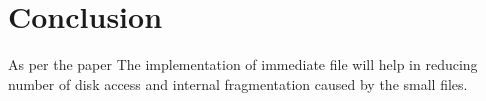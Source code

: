 \chapter{Conclusion}

As per the paper 
The implementation of immediate file will help in reducing number of disk access and internal fragmentation caused by the small files. 

